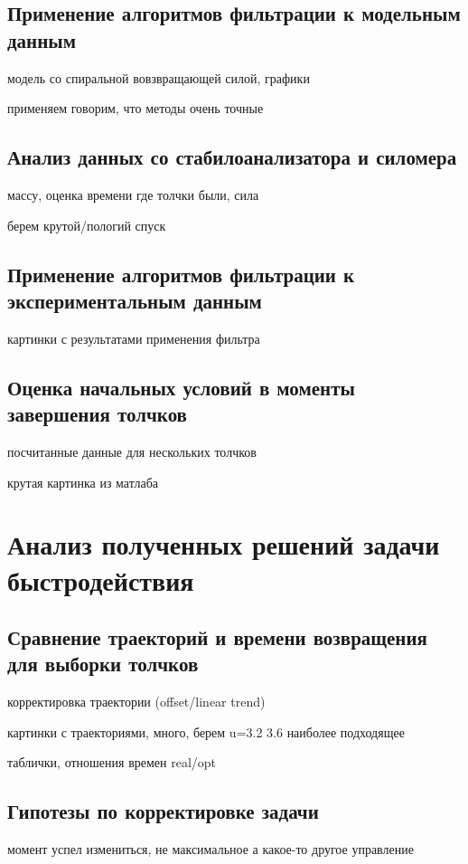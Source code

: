 \documentclass[a4paper,12pt, openany]{book}
\theoremstyle{plain} %
\theoremstyle{definition} %
\theoremstyle{remark} %
\numberwithin{equation}{chapter}
\begin{document}
{\section{Применение алгоритмов фильтрации к модельным данным}
модель со спиральной вовзвращающей силой, графики

применяем говорим, что методы очень точные

\section{Анализ данных со стабилоанализатора и силомера}
массу, оценка времени где толчки были, сила

берем крутой/пологий спуск

\section{Применение алгоритмов фильтрации к экспериментальным данным}
картинки с результатами применения фильтра

\section{Оценка начальных условий в моменты завершения толчков}
посчитанные данные для нескольких толчков

крутая картинка из матлаба

\newpage

\chapter{Анализ полученных решений задачи быстродействия}

\section{Сравнение траекторий и времени возвращения для выборки толчков} 

корректировка траектории (offset/linear trend)

картинки с траекториями, много, берем u=3.2 3.6 наиболее подходящее

таблички, отношения времен real/opt

\section{Гипотезы по корректировке задачи} 
момент успел измениться, не максимальное а какое-то другое управление


}
\end{document}
